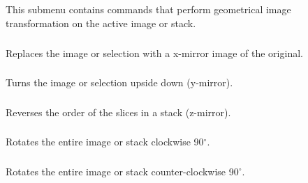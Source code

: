 \subsection{\protect{}\label{sub:Transform}}

This submenu contains commands that perform geometrical image transformation
on the active image or stack.


\subsubsection{\protect{}\label{sub:Flip-Horizontally}}

Replaces the image or selection with a x-mirror image of the original.


\subsubsection{\protect{}\label{sub:Flip-Vertically}}

Turns the image or selection upside down (y-mirror).


\subsubsection{\protect{}\label{sub:Flip-Z}}

Reverses the order of the slices in a stack (z-mirror).


\subsubsection[\protect\userinterface{Rotate 90 Degrees Right}]{\protect{}\label{sub:Rotate-90-Degrees-R}\improvement{}}

Rotates the entire image or stack clockwise 90$^{\circ}$. 


\subsubsection[\protect\userinterface{Rotate 90 Degrees Left}]{\protect{}\label{sub:Rotate-90-Degrees-L}\improvement{}}

Rotates the entire image or stack counter-clockwise 90$^{\circ}$. 


\subsubsection{\protect{}}

